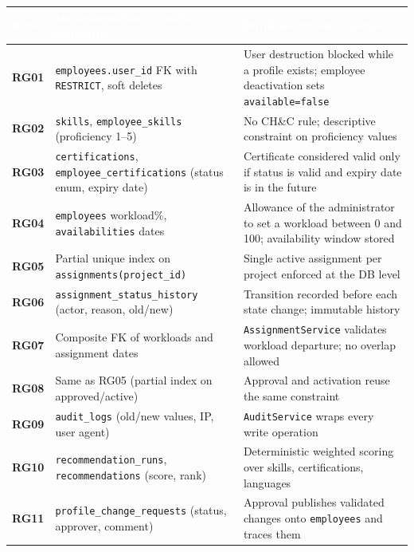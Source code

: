 \documentclass{bts-report}
\begin{document}
\begingroup\centering
\begin{tabularx}{\textwidth}{|>{\bfseries}p{2.0cm}|X|X|}
\hline
\rowcolor{tableheader}
\textcolor{white}{\textbf{Rule}} & \textcolor{white}{\textbf{Implementation --- data structure}} & \textcolor{white}{\textbf{Implementation --- service}} \\
\hline
RG01 & \texttt{employees.user\_id} FK with \texttt{RESTRICT}, soft deletes & User destruction blocked while a profile exists; employee deactivation sets \texttt{available=false} \\
\hline
RG02 & \texttt{skills}, \texttt{employee\_skills} (proficiency 1--5) & No CH\&C rule; descriptive constraint on proficiency values \\
\hline
RG03 & \texttt{certifications}, \texttt{employee\_certifications} (status enum, expiry date) & Certificate considered valid only if status is valid and expiry date is in the future \\
\hline
RG04 & \texttt{employees} workload\%, \texttt{availabilities} dates & Allowance of the administrator to set a workload between 0 and 100; availability window stored \\
\hline
RG05 & Partial unique index on \texttt{assignments(project\_id)} & Single active assignment per project enforced at the DB level \\
\hline
RG06 & \texttt{assignment\_status\_history} (actor, reason, old/new) & Transition recorded before each state change; immutable history \\
\hline
RG07 & Composite FK of workloads and assignment dates & \texttt{AssignmentService} validates workload departure; no overlap allowed \\
\hline
RG08 & Same as RG05 (partial index on approved/active) & Approval and activation reuse the same constraint \\
\hline
RG09 & \texttt{audit\_logs} (old/new values, IP, user agent) & \texttt{AuditService} wraps every write operation \\
\hline
RG10 & \texttt{recommendation\_runs}, \texttt{recommendations} (score, rank) & Deterministic weighted scoring over skills, certifications, languages \\
\hline
RG11 & \texttt{profile\_change\_requests} (status, approver, comment) & Approval publishes validated changes onto \texttt{employees} and traces them \\
\hline
\end{tabularx}\par\endgroup
\end{document}
